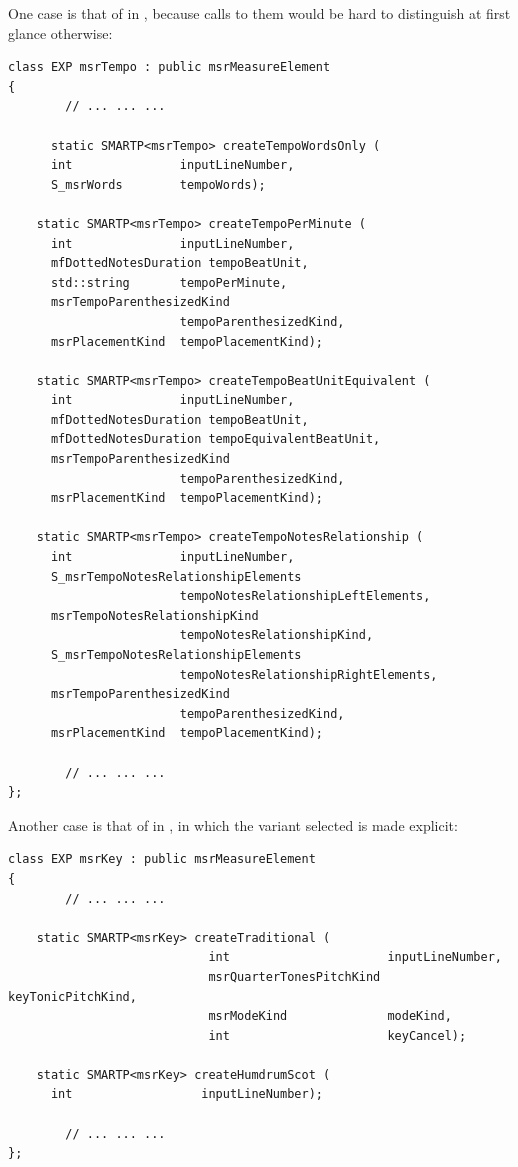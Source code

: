 One case is that of  in , because calls to them would be hard to distinguish at first glance otherwise:
\begin{lstlisting}[language=CPlusPlus]
 class EXP msrTempo : public msrMeasureElement
{
 		// ... ... ...

	  static SMARTP<msrTempo> createTempoWordsOnly (
      int               inputLineNumber,
      S_msrWords        tempoWords);

    static SMARTP<msrTempo> createTempoPerMinute (
      int               inputLineNumber,
      mfDottedNotesDuration tempoBeatUnit,
      std::string       tempoPerMinute,
      msrTempoParenthesizedKind
                        tempoParenthesizedKind,
      msrPlacementKind  tempoPlacementKind);

    static SMARTP<msrTempo> createTempoBeatUnitEquivalent (
      int               inputLineNumber,
      mfDottedNotesDuration tempoBeatUnit,
      mfDottedNotesDuration tempoEquivalentBeatUnit,
      msrTempoParenthesizedKind
                        tempoParenthesizedKind,
      msrPlacementKind  tempoPlacementKind);

    static SMARTP<msrTempo> createTempoNotesRelationship (
      int               inputLineNumber,
      S_msrTempoNotesRelationshipElements
                        tempoNotesRelationshipLeftElements,
      msrTempoNotesRelationshipKind
                        tempoNotesRelationshipKind,
      S_msrTempoNotesRelationshipElements
                        tempoNotesRelationshipRightElements,
      msrTempoParenthesizedKind
                        tempoParenthesizedKind,
      msrPlacementKind  tempoPlacementKind);

		// ... ... ...
};
\end{lstlisting}

Another case is that of  in , in which the variant selected is made explicit:
\begin{lstlisting}[language=CPlusPlus]
class EXP msrKey : public msrMeasureElement
{
		// ... ... ...

    static SMARTP<msrKey> createTraditional (
                            int                      inputLineNumber,
                            msrQuarterTonesPitchKind keyTonicPitchKind,
                            msrModeKind              modeKind,
                            int                      keyCancel);

    static SMARTP<msrKey> createHumdrumScot (
      int                  inputLineNumber);

		// ... ... ...
};
\end{lstlisting}


